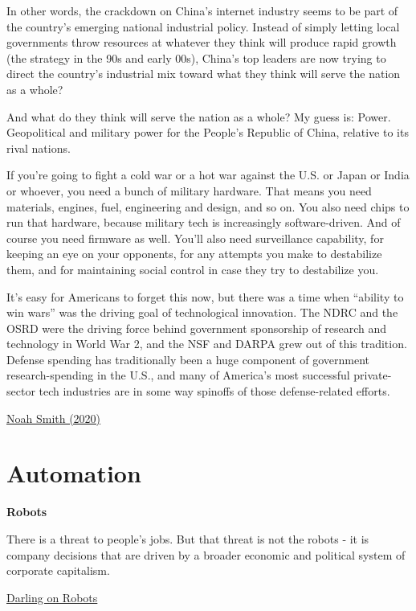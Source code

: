 \documentclass[
]{book}
\begin{document}
In other words, the crackdown on China's internet industry seems to be part of the country's emerging national industrial policy. Instead of simply letting local governments throw resources at whatever they think will produce rapid growth (the strategy in the 90s and early 00s), China's top leaders are now trying to direct the country's industrial mix toward what they think will serve the nation as a whole?

And what do they think will serve the nation as a whole? My guess is: Power. Geopolitical and military power for the People's Republic of China, relative to its rival nations.

If you're going to fight a cold war or a hot war against the U.S. or Japan or India or whoever, you need a bunch of military hardware. That means you need materials, engines, fuel, engineering and design, and so on. You also need chips to run that hardware, because military tech is increasingly software-driven. And of course you need firmware as well. You'll also need surveillance capability, for keeping an eye on your opponents, for any attempts you make to destabilize them, and for maintaining social control in case they try to destabilize you.

It's easy for Americans to forget this now, but there was a time when ``ability to win wars'' was the driving goal of technological innovation. The NDRC and the OSRD were the driving force behind government sponsorship of research and technology in World War 2, and the NSF and DARPA grew out of this tradition. Defense spending has traditionally been a huge component of government research-spending in the U.S., and many of America's most successful private-sector tech industries are in some way spinoffs of those defense-related efforts.

\href{https://noahpinion.substack.com/p/why-is-china-smashing-its-tech-industry}{Noah Smith (2020)}

\hypertarget{automation}{%
\section{Automation}\label{automation}}

\textbf{Robots}

There is a threat to people's jobs. But that threat is not the robots - it is company decisions that are driven by a broader economic and political system of corporate capitalism.

\href{https://www.theguardian.com/technology/2021/apr/17/ai-ethicist-kate-darling-robots-can-be-our-partners}{Darling on Robots}
\end{document}
